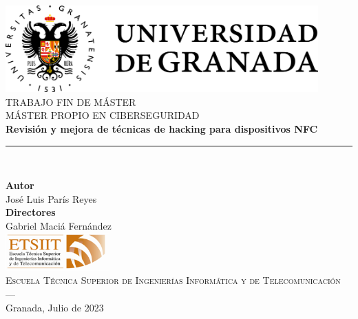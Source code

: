 \begin{titlepage}
 
 
\newlength{\centeroffset}
\setlength{\centeroffset}{-0.5\oddsidemargin}
\addtolength{\centeroffset}{0.5\evensidemargin}
\thispagestyle{empty}

\noindent\hspace*{\centeroffset}\begin{minipage}{\textwidth}

\centering
\includegraphics[width=0.9\textwidth]{imagenes/logo_ugr.png}\\[1.4cm]

\textsc{ \Large TRABAJO FIN DE MÁSTER\\[0.2cm]}
\textsc{ MÁSTER PROPIO EN CIBERSEGURIDAD}\\[1cm]
% 
{\Huge\bfseries Revisión y mejora de técnicas de hacking para dispositivos NFC\\
}
\noindent\rule[-1ex]{\textwidth}{3pt}\\[3.5ex]
\end{minipage}

\vspace{2.5cm}
\noindent\hspace*{\centeroffset}\begin{minipage}{\textwidth}
\centering

\textbf{Autor}\\{José Luis París Reyes}\\[2.5ex]
\textbf{Directores}\\{Gabriel Maciá Fernández}\\[2cm]
\includegraphics[width=0.3\textwidth]{imagenes/etsiit_logo.png}\\[0.1cm]
\textsc{Escuela Técnica Superior de Ingenierías Informática y de Telecomunicación}\\
\textsc{---}\\
Granada, Julio de 2023
\end{minipage}
\end{titlepage}


